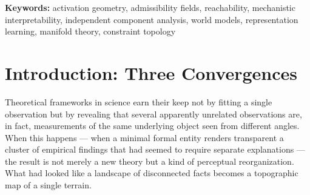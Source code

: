 \documentclass[12pt, a4paper]{article}
\theoremstyle{plain}
\theoremstyle{definition}
\theoremstyle{remark}
\begin{document}
\begin{titlepage}
\vspace{1.5cm}

{\small
\textbf{Keywords:} activation geometry, admissibility fields, reachability,
mechanistic interpretability, independent component analysis, world models,
representation learning, manifold theory, constraint topology}

\end{titlepage}

\tableofcontents
\newpage

\section{Introduction: Three Convergences}

Theoretical frameworks in science earn their keep not by fitting a single
observation but by revealing that several apparently unrelated observations
are, in fact, measurements of the same underlying object seen from different
angles. When this happens --- when a minimal formal entity renders transparent
a cluster of empirical findings that had seemed to require separate
explanations --- the result is not merely a new theory but a kind of
perceptual reorganization. What had looked like a landscape of disconnected
facts becomes a topographic map of a single terrain.
\end{document}
